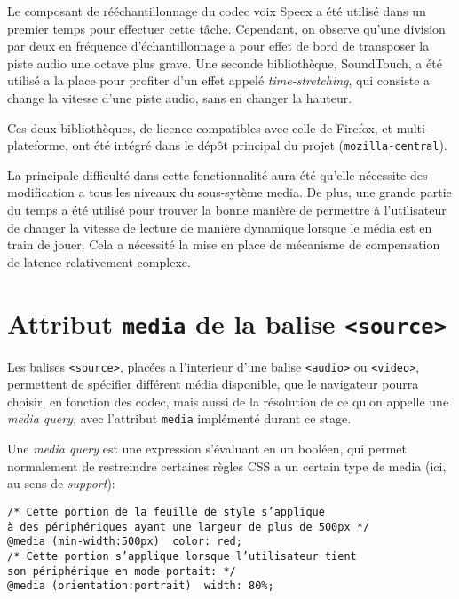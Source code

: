 \documentclass[a4paper,10pt]{article}
\newcommand{\cc}[1]{\texttt{#1}}
\begin{document}
\begin{multicols}{2}
  Le composant de rééchantillonnage du codec voix Speex a été utilisé dans un
  premier temps pour effectuer cette tâche. Cependant, on observe qu'une
  division par deux en fréquence d'échantillonnage a pour effet de bord de
  transposer la piste audio une octave plus grave. Une seconde bibliothèque,
  SoundTouch, a été utilisé a la place pour profiter d'un effet appelé
  \emph{time-stretching}, qui consiste a change la vitesse d'une piste audio,
  sans en changer la hauteur.

  Ces deux bibliothèques, de licence compatibles avec celle de Firefox, et
  multi-plateforme, ont été intégré dans le dépôt principal du projet
  (\cc{mozilla-central}).

  La principale difficulté dans cette fonctionnalité aura été qu'elle nécessite
  des modification a tous les niveaux du sous-sytème media. De plus, une grande
  partie du temps a été utilisé pour trouver la bonne manière de permettre à
  l'utilisateur de changer la vitesse de lecture de manière dynamique lorsque le
  média est en train de jouer. Cela a nécessité la mise en place de mécanisme de
  compensation de latence relativement complexe.

  \section{Attribut \cc{media} de la balise \cc{<source>}}

  Les balises \cc{<source>}, placées a l'interieur d'une balise \cc{<audio>} ou
  \cc{<video>}, permettent de spécifier différent média disponible, que le
  navigateur pourra choisir, en fonction des codec, mais aussi de la résolution
  de ce qu'on appelle une \emph{media query}, avec l'attribut \cc{media} implémenté
  durant ce stage.

  Une \emph{media query} est une expression s'évaluant en un booléen, qui permet
  normalement de restreindre certaines règles CSS a un certain type de media
  (ici, au sens de \emph{support}):

  \noindent
  {\footnotesize
  \cc{/* Cette portion de la feuille de style s'applique\\
     à des périphériques ayant une largeur de plus de 500px */\\
     @media (min-width:500px) { color: red; }\\
     /* Cette portion s'applique lorsque l'utilisateur tient\\
     son périphérique en mode portait: */ \\
     @media (orientation:portrait) { width: 80\%; }
  }}


\end{multicols}
\end{document}
